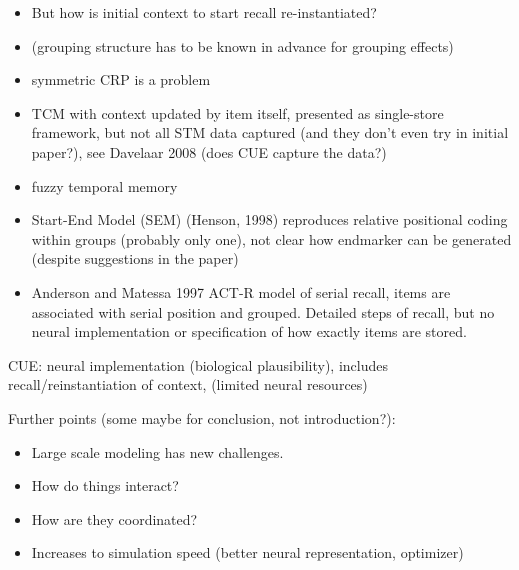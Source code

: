 \begin{itemize}
    \item But how is initial context to start recall re-instantiated?
    \item (grouping structure has to be known in advance for grouping effects)
    \item symmetric CRP is a problem
    \item TCM with context updated by item itself, presented as single-store framework, but not all STM data captured (and they don't even try in initial paper?), see Davelaar 2008 (does CUE capture the data?)
    \item fuzzy temporal memory
    \item Start-End Model (SEM) (Henson, 1998) reproduces relative positional coding within groups (probably only one), not clear how endmarker can be generated (despite suggestions in the paper)
    \item Anderson and Matessa 1997 ACT-R model of serial recall, items are associated with serial position and grouped. Detailed steps of recall, but no neural implementation or specification of how exactly items are stored.
\end{itemize}





CUE\@: neural implementation (biological plausibility), includes recall/reinstantiation of context, (limited neural resources)


Further points (some maybe for conclusion, not introduction?):
\begin{itemize}
    \item Large scale modeling has new challenges.
    \item How do things interact?
    \item How are they coordinated?
    \item Increases to simulation speed (better neural representation, optimizer)
\end{itemize}

